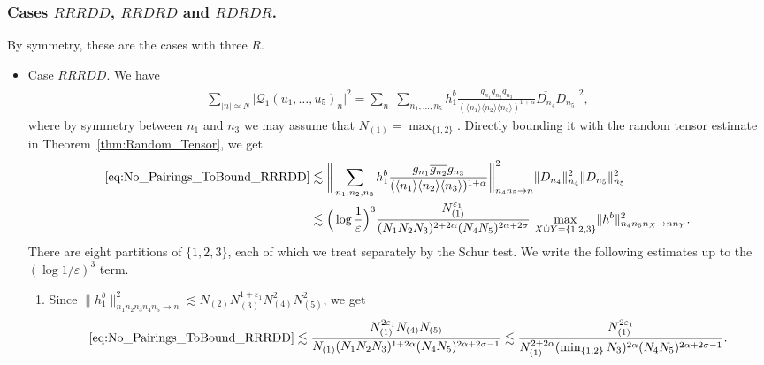 \documentclass[11pt, xcolor = dvipsnames,reqno
]{amsart}
\theoremstyle{definition}
\theoremstyle{remark}
\begin{document}
\subsubsection{Cases $RRRDD$, $RRDRD$ and $RDRDR$.}
By symmetry, these are the cases with three $R$. 

\begin{itemize}
    \item Case $RRRDD$. We have
\begin{align}\label{eq:No_Pairings_ToBound_RRRDD}
    \sum_{|n| \simeq N}  \big| \mathcal{Q}_1(u_1, \ldots, u_5)_n \big|^2
    = \sum_n 
    \Bigg| \sum_{n_1, \ldots, n_5 } h^b_1 
    \frac{g_{n_1} \overline{g_{n_2}} g_{n_3}}{ (\langle n_1 \rangle \langle n_2 \rangle\langle n_3 \rangle)^{1+\alpha}} \overline{D_{n_4}} D_{n_5} \Bigg|^2, 
\end{align}
where by symmetry between $n_1$ and $n_3$ we may assume that $N_{(1)} = \max_{\{1,2\}}$. 
Directly bounding it with the random tensor estimate in Theorem~\ref{thm:Random_Tensor}, we get
\begin{align}
    \eqref{eq:No_Pairings_ToBound_RRRDD}
    & \lesssim \bigg\lVert \sum_{n_1, n_2, n_3} h^b_1 
    \frac{g_{n_1} \overline{g_{n_2}} g_{n_3}}{ (\langle n_1 \rangle \langle n_2 \rangle\langle n_3 \rangle)^{1+\alpha}} \bigg\rVert_{n_4n_5 \to n}^2 \lVert D_{n_4} \rVert_{n_4}^2 \lVert D_{n_5} \rVert_{n_5}^2 \\
    & \lesssim \Big(\log \frac{1}{\varepsilon} \Big)^3  \frac{N_{(1)}^{\varepsilon_1}}{(N_1N_2N_3)^{2 + 2\alpha} (N_4N_5)^{2\alpha + 2\sigma}} \, 
    \max_{X \dot\cup Y = \{1,2,3\} } \lVert h^b \rVert_{n_4n_5n_X \to nn_Y}^2.
\end{align}
There are eight partitions of $\{1,2,3\}$, each of which we treat separately by the Schur test. We write the following estimates up to the $(\log 1/\varepsilon)^3$ term.  
\hfill \break

\begin{enumerate}
    \item Since $\lVert h^b_1 \rVert_{n_1n_2n_3n_4n_5 \to n}^2 \lesssim N_{(2)}N_{(3)}^{1+\varepsilon_1}N_{(4)}^2 N_{(5)}^2$, we get 
    \begin{align}
    \eqref{eq:No_Pairings_ToBound_RRRDD} 
    \lesssim 
    \frac{N_{(1)}^{2\varepsilon_1} N_{(4)} N_{(5)}}{N_{(1)} (N_1N_2N_3)^{1+ 2\alpha} (N_4N_5)^{2\alpha + 2\sigma - 1 }} 
    \lesssim 
    \frac{N_{(1)}^{2\varepsilon_1}}{N_{(1)}^{2 + 2\alpha} (\min_{\{1,2\}} N_3)^{2\alpha} (N_4N_5)^{2\alpha + 2\sigma - 1 }}.
    \end{align}


\end{enumerate}
\end{itemize}
\end{document}
